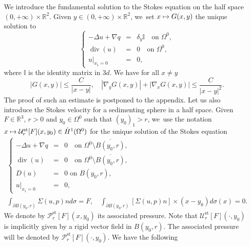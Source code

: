 \documentclass[10pt]{amsart}
\newcommand\mto{\mathchoice{\longmapsto}{\mapsto}{\mapsto}{\mapsto}}
\newcommand{\st}{\mathrm{st}}
\renewcommand{\div}{\operatorname{div}}
\theoremstyle{plain}
\theoremstyle{definition}
\newcommand{\R}{\mathbb{R}}
\begin{document}
We introduce the fundamental solution to the Stokes equation on the half space $(0,+\infty)\times \R^2$. Given $y \in (0,+\infty)\times \R^2$, we~set $x \mto G(x,y)$ the unique solution to
\begin{equation}
\left\{
\begin{array}{rcl}
-\Delta u+\nabla q &=& \delta_{y} \mathbb{I} \quad\text{on } \Omega^0, \\
\div(u)&=&0 \quad\text{on } \Omega^0, \\
u\vert_{x_1=0}&=&0,
\end{array}
\right.
\end{equation}
where $\mathbb{I}$ is the identity matrix in $3d$. We have for all $x \neq y$
\begin{equation}\label{ineq:fundamental_solution}
|G(x,y)| \leq \frac{C}{|x-y|}, \quad |\nabla_y G(x,y)|+ |\nabla_x G(x,y)| \leq \frac{C}{|x-y|^2}.
\end{equation}
The proof of such an estimate is postponed to the appendix.
Let us also introduce the Stokes velocity for a sedimenting sphere in a half space. Given $F\in \R^3$, $r>0$ and $y_0 \in \Omega^0$ such that $(y_0)_1>r$, we~use the notation $x \mto \mathcal{U}^{\st}_{r}[F](x,y_0)\in \dot{H}^1(\Omega^0)$ for the unique solution of the Stokes equation
\begin{gather} \label{eq_stokeslet}
\left\{
\begin{array}{rcl}
-\Delta u+\nabla q &=& 0\quad\text{on } \Omega^0 \setminus \overline{B(y_0,r)},\\
\div(u)&=&0 \quad\text{on }\Omega^0 \setminus \overline{B(y_0,r)},\\
D(u) &=&0 \text { on } B(y_0,r),\\
u\vert_{x_1=0}&=&0,
\end{array}
\right.
\\
\label{eq_stokeslet: force_torque}
\int_{\partial B(y_0,r)} \Sigma(u,p) n d \sigma =F,\quad
\int_{\partial B(y_0,r)} [\Sigma(u,p) n] \times(x-y_0)d \sigma(x)=0.
\end{gather}
We denote by $\mathcal{P}^{\st}_{r}[F](x,y_0) $ its associated pressure. Note that $\mathcal{U}^{\st}_{r}[F](\cdot,y_0)$ is implicitly given by a rigid vector field in $B(y_0,r)$. The associated pressure will be denoted by $\mathcal{P}^{\st}_{r}[F](\cdot,y_0)$. We have the following
\end{document}
